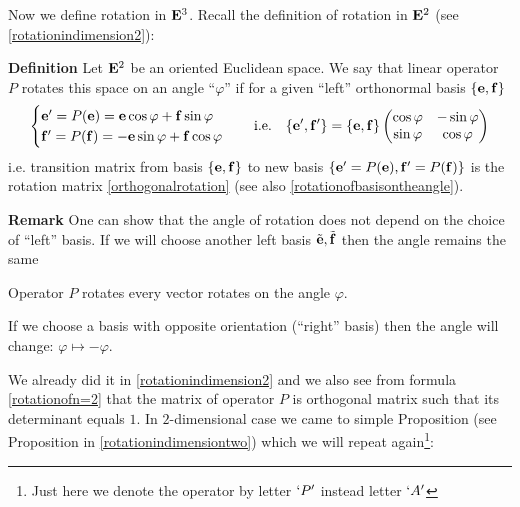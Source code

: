 \documentclass[12pt]{article}
\numberwithin{equation}{section}
\begin{document}
    Now we define rotation in ${\bf E}^3$.
    Recall the definition of rotation in ${\bf E}^2$ 
(see \ref{rotationindimension2}):

    {\bf Definition}  Let ${\bf E}^2$ be an oriented Euclidean space.
     We say that linear operator $P$ rotates this space on an angle ``$\varphi$''
     if for a given ``left'' orthonormal  basis $\{{\bf e},{\bf f}\}$
                           \begin{equation}\label{rotationofn=2}
                                 \begin{cases}
                      {\bf e}'=P({\bf e})={\bf e}\cos\varphi+{\bf f}\sin\varphi\cr
                      {\bf f}'=P({\bf f})=-{\bf e}\sin\varphi+{\bf f}\cos\varphi\cr
                                \end{cases}\quad
                                {\rm i.e.}\quad
                                \{{\bf e}',{\bf f}'\}=\{{\bf e},{\bf f}\}
                                 \begin{pmatrix}
                                \cos\varphi &-\sin\varphi\cr
                               \sin\varphi &\cos\varphi\cr
                              \end {pmatrix}
                                 \end{equation}
i.e. transition matrix from basis $\{{\bf e},{\bf f}\}$ to new basis
$\{{\bf e}'=P({\bf e}),{\bf f}'=P({\bf f})\}$
is the rotation matrix \eqref{orthogonalrotation} (see also \eqref{rotationofbasisontheangle}).


{\bf Remark}  One can show that the angle of rotation
does not depend on the choice of ``left'' basis.
If we will choose another
left basis ${\tilde{{\bf e}},\tilde{{\bf f}}}$ then the angle remains the same

Operator $P$ rotates every vector rotates on the angle $\varphi$.

If we choose a basis with opposite orientation
(``right'' basis) then the angle will change: $\varphi\mapsto-\varphi$.


\m
We already did it in \ref{rotationindimension2}
and we also
see from formula \eqref{rotationofn=2} that
the matrix of operator $P$ is orthogonal matrix
 such that its determinant equals $1$.
In $2$-dimensional case we came
 to simple Proposition (see Proposition in \ref{rotationindimensiontwo})
which we will repeat again\footnote{Just here we denote the operator by
letter $`P'$ instead letter $`A'$}:
\end{document}
